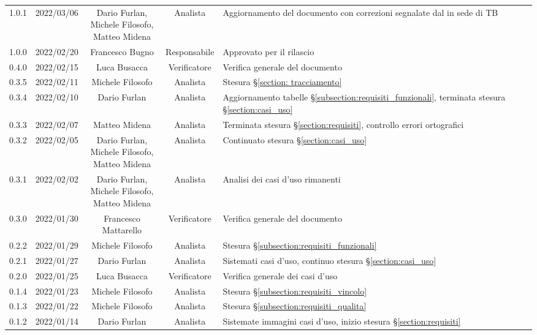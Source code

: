 \begin{center}
\begin{longtable}[c]{c | c | c | c | p{5cm}}
		1.0.1 & 2022/03/06 & \Shortunderstack{Dario Furlan,\\Michele Filosofo,\\Matteo Midena} & Analista & Aggiornamento del documento con correzioni segnalate dal \commitNameS{} in sede di TB \\
		1.0.0 & 2022/02/20 & Francesco Bugno & Responsabile & Approvato per il rilascio\\
		0.4.0 & 2022/02/15 & Luca Busacca & Verificatore & Verifica generale del documento\\
		0.3.5 & 2022/02/11 & Michele Filosofo & Analista & Stesura §\ref{section: tracciamento}\\
		0.3.4 & 2022/02/10 & Dario Furlan & Analista & Aggiornamento tabelle §\ref{subsection:requisiti_funzionali}, terminata stesura §\ref{section:casi_uso} \\
		0.3.3 & 2022/02/07 & Matteo Midena & Analista & Terminata stesura §\ref{section:requisiti}, controllo errori ortografici \\
		0.3.2 & 2022/02/05 & \Shortunderstack{Dario Furlan,\\Michele Filosofo,\\Matteo Midena\\} & Analista & Continuato stesura §\ref{section:casi_uso} \\
		0.3.1 & 2022/02/02 & \Shortunderstack{Dario Furlan,\\Michele Filosofo,\\Matteo Midena\\} & Analista & Analisi dei casi d'uso rimanenti \\
		0.3.0 & 2022/01/30 & Francesco Mattarello & Verificatore & Verifica generale del documento\\
		0.2.2 & 2022/01/29 & Michele Filosofo & Analista & Stesura §\ref{subsection:requisiti_funzionali}\\
		0.2.1 & 2022/01/27 & Dario Furlan & Analista & Sistemati casi d'uso, continuo stesura §\ref{section:casi_uso}\\
		0.2.0 & 2022/01/25 & Luca Busacca & Verificatore & Verifica generale dei casi d'uso\\
		0.1.4 & 2022/01/23 & Michele Filosofo & Analista & Stesura §\ref{subsection:requisiti_vincolo}\\
		0.1.3 & 2022/01/22 & Michele Filosofo & Analista & Stesura §\ref{subsection:requisiti_qualita}\\
		0.1.2 & 2022/01/14 & Dario Furlan & Analista & Sistemate immagini casi d'uso, inizio stesura §\ref{section:requisiti}\\

\end{longtable}
\end{center}
